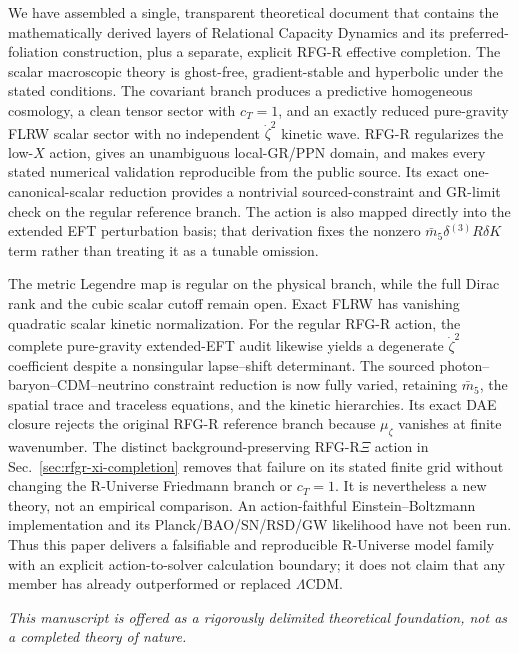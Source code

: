 \documentclass[11pt,a4paper]{article}
\begin{document}
We have assembled a single, transparent theoretical document that contains the mathematically derived layers of Relational Capacity Dynamics and its preferred-foliation construction, plus a separate, explicit RFG-R effective completion. The scalar macroscopic theory is ghost-free, gradient-stable and hyperbolic under the stated conditions. The covariant branch produces a predictive homogeneous cosmology, a clean tensor sector with \(c_T=1\), and an exactly reduced pure-gravity FLRW scalar sector with no independent \(\dot\zeta^2\) kinetic wave. RFG-R regularizes the low-\(X\) action, gives an unambiguous local-GR/PPN domain, and makes every stated numerical validation reproducible from the public source. Its exact one-canonical-scalar reduction provides a nontrivial sourced-constraint and GR-limit check on the regular reference branch. The action is also mapped directly into the extended EFT perturbation basis; that derivation fixes the nonzero \(\bar m_5\delta{}^{(3)}R\delta K\) term rather than treating it as a tunable omission.

The metric Legendre map is regular on the physical branch, while the full Dirac rank and the cubic scalar cutoff remain open. Exact FLRW has vanishing quadratic scalar kinetic normalization. For the regular RFG-R action, the complete pure-gravity extended-EFT audit likewise yields a degenerate \(\dot\zeta^2\) coefficient despite a nonsingular lapse--shift determinant. The sourced photon--baryon--CDM--neutrino constraint reduction is now fully varied, retaining \(\bar m_5\), the spatial trace and traceless equations, and the kinetic hierarchies. Its exact DAE closure rejects the original RFG-R reference branch because \(\mu_\zeta\) vanishes at finite wavenumber. The distinct background-preserving RFG-R\(\Xi\) action in Sec.~\ref{sec:rfgr-xi-completion} removes that failure on its stated finite grid without changing the R-Universe Friedmann branch or \(c_T=1\). It is nevertheless a new theory, not an empirical comparison. An action-faithful Einstein--Boltzmann implementation and its Planck/BAO/SN/RSD/GW likelihood have not been run. Thus this paper delivers a falsifiable and reproducible R-Universe model family with an explicit action-to-solver calculation boundary; it does not claim that any member has already outperformed or replaced \(\Lambda\)CDM.

\vspace{1.2em}
\noindent\textit{This manuscript is offered as a rigorously delimited theoretical foundation, not as a completed theory of nature.}
\end{document}
